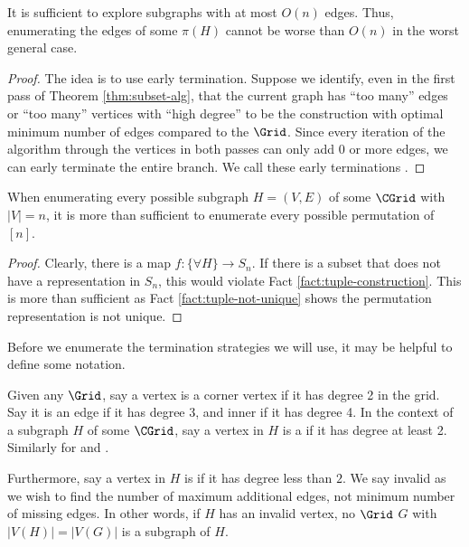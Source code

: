 \begin{theorem}
It is sufficient to explore subgraphs with at most $O(n)$ edges. Thus, enumerating the edges of some $\pi(H)$ cannot be worse than $O(n)$ in the worst general case.
\begin{proof}
 The idea is to use early termination. Suppose we identify, even in the first pass of Theorem \ref{thm:subset-alg}, that the current graph has ``too many'' edges or ``too many'' vertices with ``high degree'' to be the construction with optimal minimum number of edges compared to the $\Grid$. Since every iteration of the algorithm through the vertices in both passes can only add 0 or more edges, we can early terminate the entire branch. We call these early terminations .
\end{proof}
\end{theorem}

\begin{theorem}
When enumerating every possible subgraph $H = (V,E)$ of some $\CGrid$ with $|V| = n$, it is more than sufficient to enumerate every possible permutation of $[n]$.
\begin{proof}
Clearly, there is a map $f: \{\forall H\} \to S_n$. If there is a subset that does not have a representation in $S_n$, this would violate Fact \ref{fact:tuple-construction}. This is more than sufficient as Fact \ref{fact:tuple-not-unique} shows the permutation representation is not unique.
\end{proof}
\end{theorem}

Before we enumerate the termination strategies we will use, it may be helpful to define some notation.

\begin{definition}
\label{def:vertex-names}
Given any $\Grid$, say a vertex is a corner vertex if it has degree 2 in the grid. Say it is an edge if it has degree 3, and inner if it has degree 4. In the context of a subgraph $H$ of some $\CGrid$, say a vertex in $H$ is a  if it has degree at least 2. Similarly for  and . 

Furthermore, say a vertex in $H$ is  if it has degree less than $2$. We say invalid as we wish to find the number of maximum additional edges, not minimum number of missing edges. In other words, if $H$ has an invalid vertex, no $\Grid$ $G$ with $|V(H)| = |V(G)|$ is a subgraph of $H$.
\end{definition}


